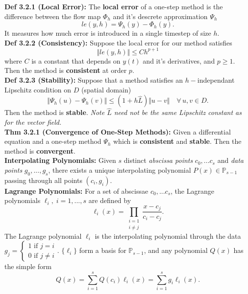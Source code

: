 \documentclass[10pt,a4paper]{article}
\renewcommand{\P}{\mathbb{P}}
\newcommand{\norm}[1]{\Vert #1 \Vert}
\begin{document}
\begin{multicols*}{2}
\textbf{Def 3.2.1 (Local Error):} The \textbf{local error} of a one-step method is the difference between the flow map $\Phi_h$ and it's descrete approximation $\Psi_h$ 
\[ le(y, h) = \Psi_h(y) - \Phi_h(y).\]
It measures how much error is introduced in a single timestep of size $h$.\\

\textbf{Def 3.2.2 (Consistency):} Suppose the local error for our method satisfies 
\[ \Vert le(y, h) \Vert \leq Ch^{p + 1} \]
 where $C$ is a constant that depends on $y(t)$ and it's derivatives, and $p \geq 1$. Then the method is \textbf{consistent} at order $p$.\\

\textbf{Def 3.2.3 (Stability):} Suppose that a method satisfies an $h-$independant Lipschitz condition on $D$ (spatial domain)
 \[ \norm{\Psi_h(u) - \Psi_h(v)} \leq (1 + h\hat L)\norm{u - v} \quad \forall\, u, v \in D. \]
 Then the method is \textbf{stable}. \textit{Note $\hat L$ need not be the same Lipschitz constant as for the vector field.}\\

\textbf{Thm 3.2.1 (Convergence of One-Step Methods):} Given a differential equation and a one-step method $\Psi_h$ which is \textbf{consistent} and \textbf{stable}. Then the method is \textbf{convergent}.\\

\textbf{Interpolating Polynomials:} Given $s$ distinct \textit{abscissa points} $c_0, ... c_s$ and \textit{data points} $g_0, ..., g_s$, there exists a unique interpolating polynomial $P(x) \in \P_{s - 1}$ passing through all points $(c_i, g_i)$.\\

\textbf{Lagrange Polynomials:} For a set of abscissae $c_0, ... c_s$, the Lagrange polynomials $\ell_i, \; i = 1,...,s$ are defined by \[
\ell_i(x) = \prod_{\begin{smallmatrix}i = 1 \\ i \neq j\end{smallmatrix}} \frac{x - c_j}{c_i - c_j}.
\]
The Lagrange polynomial $\ell_i$ is the interpolating polynomial through the data $g_j = \begin{cases*} 1 \text{ if } j = i \\ 0 \text{ if } j \neq i \end{cases*}$. $\{\ell_i\}$ form a basis for $\P_{s - 1}$, and any polynomial $Q(x)$ has the simple form \[
Q(x) = \sum_{i=1}^s Q(c_i) \ell_i(x) =  \sum_{i=1}^s g_i \ell_i(x) .   
\]


\end{multicols*}
\end{document}
